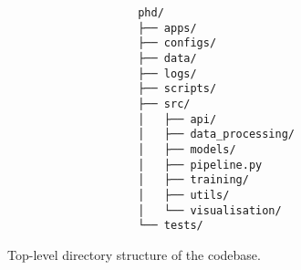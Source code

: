 \begin{figure}[h]
    \caption{Top-level directory structure of the codebase.}
    \label{fig:top_level_tree}
    \begin{verbatim}
                    phd/
                    ├── apps/
                    ├── configs/
                    ├── data/
                    ├── logs/
                    ├── scripts/
                    ├── src/
                    │   ├── api/
                    │   ├── data_processing/
                    │   ├── models/
                    │   ├── pipeline.py
                    │   ├── training/
                    │   ├── utils/
                    │   └── visualisation/
                    └── tests/
    \end{verbatim}
\end{figure}